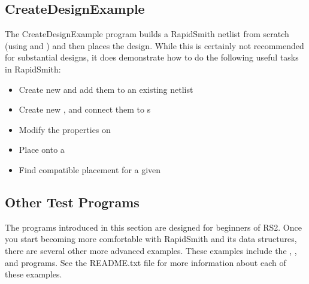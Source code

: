 \subsection{CreateDesignExample} \label{sec:createDesignExample}
The CreateDesignExample program builds a RapidSmith netlist from scratch (using
\cells and \cellnets) and then places the design. While this is certainly not
recommended for substantial designs, it does demonstrate how to do the
following useful tasks in RapidSmith:

\begin{itemize}
  \item Create new \cells and add them to an existing netlist
  \item Create new \cellnets, and connect them to s
  \item Modify the properties on \cells
  \item Place \cells onto a \bels
  \item Find compatible \bel placement for a given \cell
\end{itemize}

\subsection{Other Test Programs}
The programs introduced in this section are designed for beginners of RS2. Once
you start becoming more comfortable with RapidSmith and its data structures,
there are several other more advanced examples. These examples include the
, , and 
programs. See the README.txt file for more information about each of these
examples.